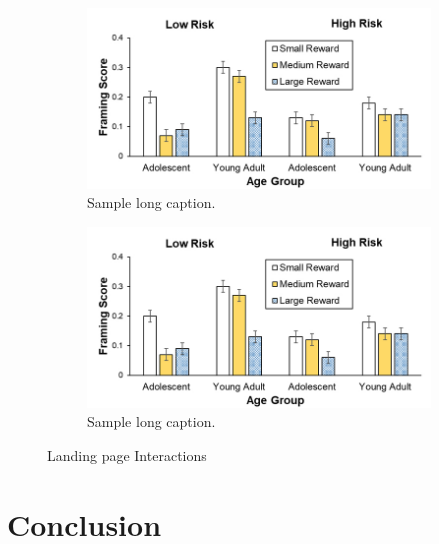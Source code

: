 \documentclass{silreport}
\begin{document}
\begin{figure}
  \centering
      
      \begin{subfigure}{0.5\linewidth}
        \centering
        \includegraphics[width=0.5\linewidth]{figures/sample_figure.jpg}
        \caption[Sample short figure (apprears on the ToC)]{Sample long caption.}
        \label{fig:sample_figure_1}
      \end{subfigure}%
      
      \begin{subfigure}{0.5\linewidth}
        \centering
        \includegraphics[width=0.5\linewidth]{figures/sample_figure.jpg}
        \caption[Sample short figure (apprears on the ToC)]{Sample long caption.}
        \label{fig:sample_figure_2}
      \end{subfigure}
  
  \caption{Landing page Interactions}
  \label{fig:test}
  \end{figure}
 
  \lipsum[1-2]


\chapter{Conclusion}
\lipsum[1]

\begingroup
\singlespacing
\makeatletter
\def\@makeschapterhead#1{%
  {\parindent \z@ \raggedright
    \normalfont
    \interlinepenalty\@M
    \Huge \bfseries  #1\par\nobreak
    \vskip 40\p@
  }}
\makeatother
\end{document}

